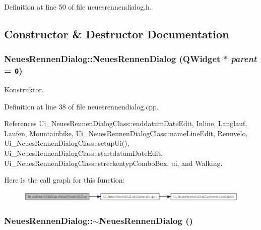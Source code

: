 Definition at line 50 of file neuesrennendialog.h.

\subsection{Constructor \& Destructor Documentation}
\hypertarget{class_neues_rennen_dialog_93cf71a6e076a554db7db78134961bc0}{
\subsubsection[NeuesRennenDialog]{\setlength{\rightskip}{0pt plus 5cm}NeuesRennenDialog::NeuesRennenDialog (QWidget $\ast$ {\em parent} = {\tt 0})}}
\label{class_neues_rennen_dialog_93cf71a6e076a554db7db78134961bc0}


Konstruktor. 



Definition at line 38 of file neuesrennendialog.cpp.

References Ui\_\-NeuesRennenDialogClass::enddatumDateEdit, Inline, Langlauf, Laufen, Mountainbike, Ui\_\-NeuesRennenDialogClass::nameLineEdit, Rennvelo, Ui\_\-NeuesRennenDialogClass::setupUi(), Ui\_\-NeuesRennenDialogClass::startdatumDateEdit, Ui\_\-NeuesRennenDialogClass::streckentypComboBox, ui, and Walking.

Here is the call graph for this function:\nopagebreak
\begin{figure}[H]
\begin{center}
\leavevmode
\includegraphics[width=350pt]{class_neues_rennen_dialog_93cf71a6e076a554db7db78134961bc0_cgraph}
\end{center}
\end{figure}
\hypertarget{class_neues_rennen_dialog_366aac9dfe8ee1c463bbb71934a4f6e6}{
\subsubsection[$\sim$NeuesRennenDialog]{\setlength{\rightskip}{0pt plus 5cm}NeuesRennenDialog::$\sim$NeuesRennenDialog ()}}
\label{class_neues_rennen_dialog_366aac9dfe8ee1c463bbb71934a4f6e6}


